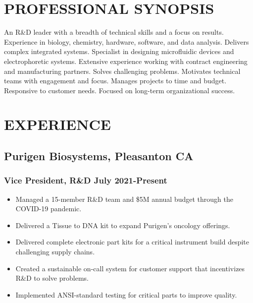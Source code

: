 \documentclass{res}
\begin{document}

\address{1125 Court Street \\ Alameda, CA 94538 \\ (650) 391-8463}

\address{Citizenship: United States \\ \\ lewis.a.marshall@gmail.com}

\begin{resume}

\section{PROFESSIONAL SYNOPSIS}
    An R\&D leader with a breadth of technical skills and a focus on results.\\[4pt]
    Experience in biology, chemistry, hardware, software, and data analysis.
    Delivers complex integrated systems.
    Specialist in designing microfluidic devices and electrophoretic systems.
    Extensive experience working with contract engineering and manufacturing partners.
    Solves challenging problems.
    Motivates technical teams with engagement and focus.
    Manages projects to time and budget.
    Responsive to customer needs.
    Focused on long-term organizational success.



\section{EXPERIENCE}
\vspace{-0.1in}

   \subsection{Purigen Biosystems, Pleasanton CA}

    \subsubsection{Vice President, R\&D \> July 2021-Present}
       \begin{itemize}
        \item Managed a 15-member R\&D team and \$5M annual budget through the COVID-19 pandemic.
        \item Delivered a Tissue to DNA kit to expand Purigen's oncology offerings.
        \item Delivered complete electronic part kits for a critical instrument build despite challenging supply chains.
        \item Created a sustainable on-call system for customer support that incentivizes R\&D to solve problems.
        \item Implemented ANSI-standard testing for critical parts to improve quality.
       \end{itemize}


\end{resume}
\end{document}
